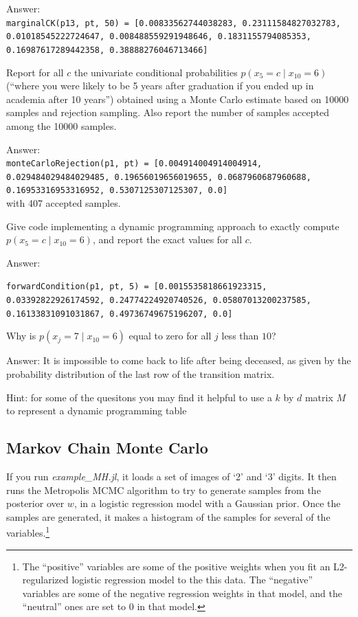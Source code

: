 \documentclass{article}
\def\ans#1{\par\gre{Answer: #1}}
\def\blu#1{{\color{blu}#1}}
\def\gre#1{{\color{gre}#1}}
\def\cond{\; | \;}
\begin{document}
{\ans{\\
\texttt{marginalCK(p13, pt, 50) = [0.00833562744038283, 0.23111584827032783, 0.01018545222724647, 0.008488559291948646, 0.1831155794085353, 0.16987617289442358, 0.38888276046713466]}
}
\item \blu{Report for all $c$ the univariate conditional probabilities $p(x_5 = c \cond  x_{10} = 6)$ (``where  you were likely to be 5 years after graduation if you ended up in academia after 10 years'') obtained using a Monte Carlo estimate based on 10000 samples and rejection sampling. Also report the number of samples accepted among the 10000 samples.}
\ans{\\
\texttt{monteCarloRejection(p1, pt) = [0.004914004914004914, 0.029484029484029485, 0.19656019656019655, 0.0687960687960688, 0.16953316953316952, 0.5307125307125307, 0.0]}\\
with 407 accepted samples.
}
\item \blu{Give code implementing a dynamic programming approach to exactly compute $p(x_5 = c \cond  x_{10} = 6)$, and report the exact values for all $c$.}
\ans{

\texttt{forwardCondition(p1, pt, 5) = [0.0015535818661923315, 0.03392822926174592, 0.24774224920740526, 0.05807013200237585, 0.16133831091031867, 0.49736749675196207, 0.0]}
}
\item \blu{Why is $p(x_j = 7 \cond x_{10} = 6)$ equal to zero for all $j$ less than $10$?}
\ans{
It is impossible to come back to life after being deceased, as given by the probability distribution of the last row of the transition matrix.
}
}
Hint: for some of the quesitons you may find it helpful to use a $k$ by $d$ matrix $M$ to represent a dynamic programming table


\pagebreak

\subsection{Markov Chain Monte Carlo}

If you run \emph{example\_MH.jl}, it loads a set of images of `2' and `3' digits. It then runs the Metropolis MCMC algorithm to try to generate samples from the posterior over $w$, in a logistic regression model with a Gaussian prior. Once the samples are generated, it makes a histogram of the samples for several of the variables.\footnote{The ``positive'' variables are some of the positive weights  when you fit an L2-regularized logistic regression model to the this data. The ``negative'' variables are some of the negative regression weights in that model, and the ``neutral'' ones are set to 0 in that model.}
\end{document}
